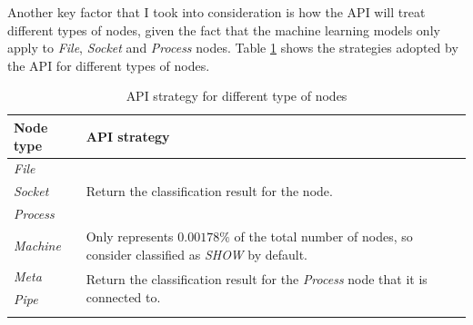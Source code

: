 	Another key factor that I took into consideration is how the API will treat different types of nodes, given the fact that the machine learning models only apply to \textit{File}, \textit{Socket} and \textit{Process} nodes. Table \ref{Table: impl/REST/API-strategy} shows the strategies adopted by the API for different types of nodes.
	\begin{longtable}{|p{}|p{}|}
		\textbf{Node type} & \textbf{API strategy} \\
		\hline
		\textit{File} & \multirow{3}{*}{Return the classification result for the node.} \\
		\textit{Socket} & \\
		\textit{Process} & \\
		\hline
		\textit{Machine} & Only represents $0.00178\%$ of the total number of nodes, so consider classified as \textit{SHOW} by default. \\
		\hline
		\textit{Meta} & \multirow{2}{*}{Return the classification result for the \textit{Process} node that it is connected to.} \\
		\textit{Pipe} & \\
		\hline
		\caption{API strategy for different type of nodes}
		\label{Table: impl/REST/API-strategy}
 	\end{longtable}
 
